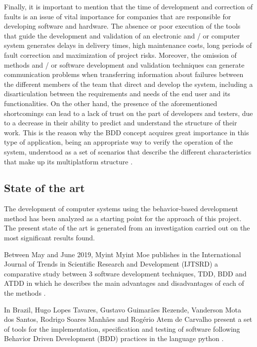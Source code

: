 \documentclass[journal]{IEEEtran}	%
\begin{document}
Finally, it is important to mention that the time of development and correction of faults is an issue of vital importance for companies that are responsible for developing software and hardware. The absence or poor execution of the tools that guide the development and validation of an electronic and / or computer system generates delays in delivery times, high maintenance costs, long periods of fault correction and maximization of project risks. Moreover, the omission of methods and / or software development and validation techniques can generate communication problems when transferring information about failures between the different members of the team that direct and develop the system, including a disarticulation between the requirements and needs of the end user and its functionalities. On the other hand, the presence of the aforementioned shortcomings can lead to a lack of trust on the part of developers and testers, due to a decrease in their ability to predict and understand the structure of their work. This is the reason why the BDD concept acquires great importance in this type of application, being an appropriate way to verify the operation of the system, understood as a set of scenarios that describe the different characteristics that make up its multiplatform structure \cite{nascimento2020behavior,soeken2012assisted,north2010introducing}.

\subsection{State of the art}

The development of computer systems using the behavior-based development method has been analyzed as a starting point for the approach of this project. The present state of the art is generated from an investigation carried out on the most significant results found.

Between May and June 2019, Myint Myint Moe publishes in the International Journal of Trends in Scientific Research and Development (IJTSRD) a comparative study between 3 software development techniques, TDD, BDD and ATDD in which he describes the main advantages and disadvantages of each of the methods \cite{moe2019comparative}.

In Brazil, Hugo Lopes Tavares, Gustavo Guimarães Rezende, Vanderson Mota dos Santos, Rodrigo Soares Manhães and Rogério Atem de Carvalho present a set of tools for the implementation, specification and testing of software following Behavior Driven Development (BDD) practices in the language python \cite{tavares2010tool}.
\end{document}

